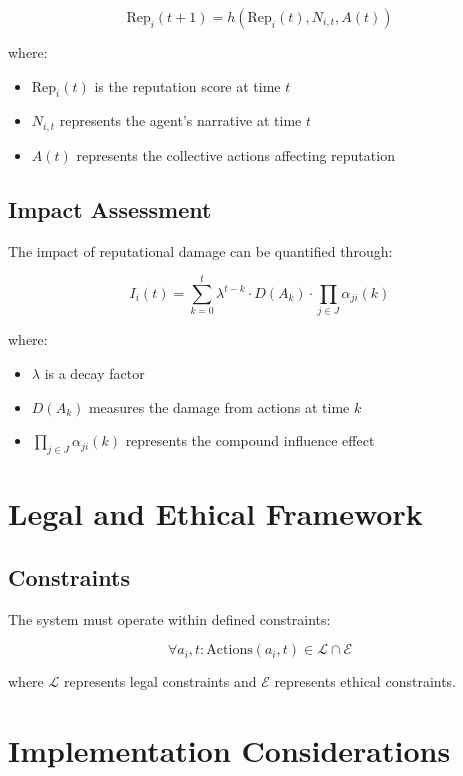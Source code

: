 \documentclass[12pt, a4paper]{article}
\begin{document}
\begin{equation}
\text{Rep}_i(t+1) = h(\text{Rep}_i(t), N_{i,t}, A(t))
\end{equation}

where:
\begin{itemize}
\item $\text{Rep}_i(t)$ is the reputation score at time $t$
\item $N_{i,t}$ represents the agent's narrative at time $t$
\item $A(t)$ represents the collective actions affecting reputation
\end{itemize}

\subsection{Impact Assessment}
The impact of reputational damage can be quantified through:

\begin{equation}
I_i(t) = \sum_{k=0}^t \lambda^{t-k} \cdot D(A_k) \cdot \prod_{j \in J} \alpha_{ji}(k)
\end{equation}

where:
\begin{itemize}
\item $\lambda$ is a decay factor
\item $D(A_k)$ measures the damage from actions at time $k$
\item $\prod_{j \in J} \alpha_{ji}(k)$ represents the compound influence effect
\end{itemize}

\section{Legal and Ethical Framework}
\subsection{Constraints}
The system must operate within defined constraints:

\begin{equation}
\forall a_i, t: \text{Actions}(a_i, t) \in \mathcal{L} \cap \mathcal{E}
\end{equation}

where $\mathcal{L}$ represents legal constraints and $\mathcal{E}$ represents ethical constraints.

\section{Implementation Considerations}
\end{document}
